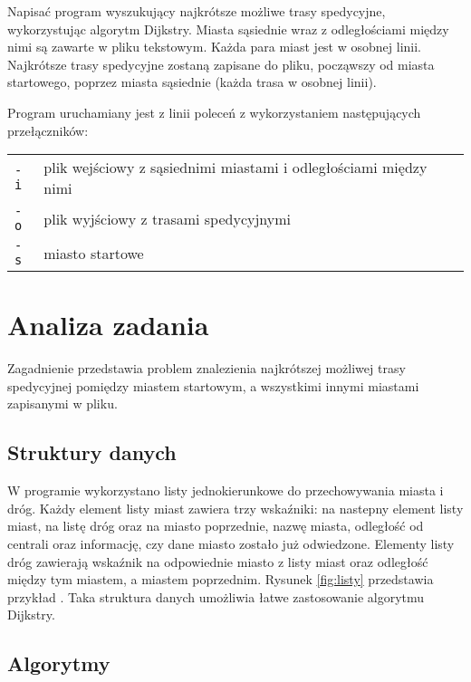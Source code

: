 \documentclass[12pt,a4paper,twoside]{article}
\begin{document}
Napisać program wyszukujący najkrótsze możliwe trasy spedycyjne, wykorzystując algorytm Dijkstry. Miasta sąsiednie wraz z odległościami między nimi są zawarte w pliku tekstowym. Każda para miast jest w osobnej linii. Najkrótsze trasy spedycyjne zostaną zapisane do pliku, począwszy od miasta startowego, poprzez miasta sąsiednie (każda trasa w osobnej linii).

Program uruchamiany jest z linii poleceń z wykorzystaniem następujących przełączników:
 
\begin{tabular}{ll}
\texttt{-i}  & plik wejściowy z sąsiednimi miastami i odległościami między nimi\\
\texttt{-o}  & plik wyjściowy z trasami spedycyjnymi\\
\texttt{-s}  & miasto startowe\\
\end{tabular}

\section{Analiza zadania}

Zagadnienie przedstawia problem znalezienia najkrótszej możliwej trasy spedycyjnej pomiędzy miastem startowym, a wszystkimi innymi miastami zapisanymi w pliku.

\subsection{Struktury danych}

W programie wykorzystano listy jednokierunkowe do przechowywania miasta i dróg. Każdy element listy miast zawiera trzy wskaźniki: na nastepny element listy miast, na listę dróg oraz na miasto poprzednie, nazwę miasta, odległość od centrali oraz informację, czy dane miasto zostało już odwiedzone. Elementy listy dróg zawierają wskaźnik na odpowiednie miasto z listy miast oraz odległość między tym miastem, a miastem poprzednim.
Rysunek \ref{fig:listy} przedstawia przykład . 
Taka struktura danych umożliwia łatwe zastosowanie algorytmu Dijkstry.


\subsection{Algorytmy}
\end{document}
